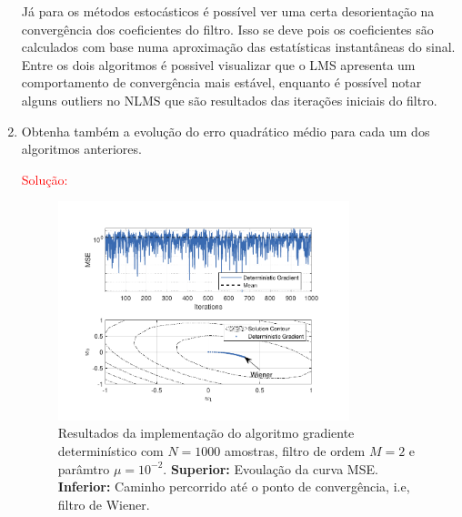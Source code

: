 \begin{enumerate}
        Já para os métodos estocásticos é possível ver uma certa desorientação na convergência dos coeficientes do filtro. Isso se deve pois os coeficientes são calculados com base numa aproximação das 
        estatísticas instantâneas do sinal. Entre os dois algoritmos é possivel visualizar que o LMS apresenta um comportamento de convergência mais estável, enquanto é possível notar alguns outliers no NLMS que são resultados das 
        iterações iniciais do filtro.

    \item Obtenha também a evolução do erro quadrático médio para cada um dos algoritmos anteriores.
        
        \textcolor{red}{Solução:}

        \begin{figure}[!htp]
            \centering
            \includegraphics[width=0.80\textwidth]{fig/hw3p4-dga.pdf}
            \caption{Resultados da implementação do algoritmo gradiente determinístico com $N = 1000$ amostras, filtro de ordem $M = 2$ e parâmtro $\mu = 10^{-2}$. \textbf{Superior:} Evoulação da curva MSE. \textbf{Inferior:} Caminho percorrido até o ponto de convergência, i.e, filtro de Wiener.}
            \label{fig:hw3p4-dga}
        \end{figure}


\end{enumerate}
